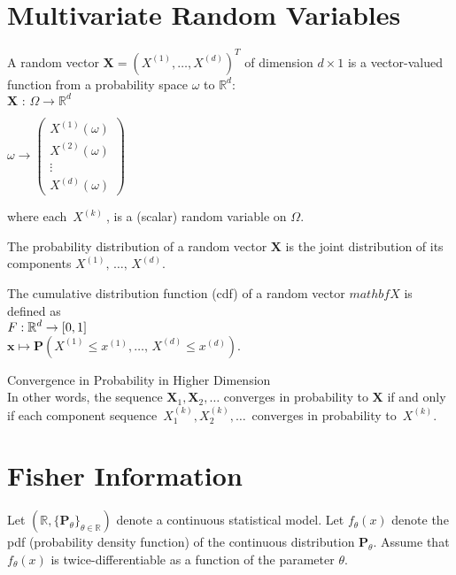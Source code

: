 \section{Multivariate Random Variables}


A random vector $\mathbf X= \left(X^{(1)},\dots ,X^{(d)}\right)^ T$ of dimension $d \times 1$ is a vector-valued function from a probability space $\omega$ to $\mathbb {R}^ d$:\\

$\displaystyle  \mathbf{X}\, \, :\,  \Omega \longrightarrow \displaystyle  \mathbb {R}^ d$

$\displaystyle \omega  \longrightarrow \displaystyle \begin{pmatrix}  X^{(1)}(\omega ) \\ X^{(2)}(\omega )\\ \vdots \\ X^{(d)}(\omega )\end{pmatrix}$

where each $\, X^{(k)}\ $, is a (scalar) random variable on $\Omega$. 

The probability distribution of a random vector $\mathbf X$ is the joint distribution of its components $X^{(1)},\, \ldots ,\, X^{(d)}$. 

The cumulative distribution function (cdf) of a random vector $mathbf X$ is defined as \\
$\displaystyle  \displaystyle F: \mathbb {R}^ d \rightarrow \displaystyle  [0,1]$\\

$\displaystyle \mathbf{x} \displaystyle \mapsto \displaystyle  \mathbf{P}(X^{(1)}\leq x^{(1)},\ldots ,\, X^{(d)}\leq x^{(d)}).$

Convergence in Probability in Higher Dimension\\

In other words, the sequence $\mathbf{X}_1, \mathbf{X}_2,\ldots$ converges in probability to $\mathbf{X}$ if and only if each component sequence $\, X_1^{(k)},X_2^{(k)},\ldots \,$ converges in probability to $\, X^{(k)}$.

\section{Fisher Information}

Let $(\mathbb {R}, \{ \mathbf{P}_\theta \} _{\theta \in \mathbb {R}})$ denote a continuous statistical model. Let $f_\theta (x)$ denote the pdf (probability density function) of the continuous distribution $\mathbf{P}_\theta$. Assume that $f_\theta (x)$ is twice-differentiable as a function of the parameter $\theta$.

